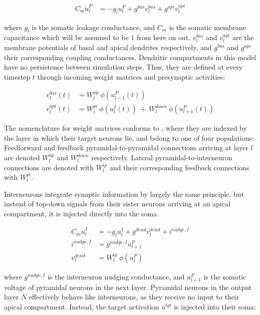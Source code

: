 \begin{align}
  C_m \dot{u}_l^P & = - g_l u_l^{P} + g^{bas} v_l^{bas} + g^{api} v_l^{api} \label{eq-pyr-dynamics-rate}
\end{align}

where $g_l$ is the somatic leakage conductance, and $C_m$ is the somatic membrane capacitance which will be assumed to
be $1$ from here on out. $v_l^{bas}$ and $v_l^{api}$ are the membrane potentials of basal and apical dendrites
respectively, and $g^{bas}$ and $g^{api}$ their corresponding coupling conductances.  Dendritic compartments in this
model have no persistence between simulation steps. Thus, they are defined at every timestep $t$ through incoming weight
matrices and presynaptic activities:

\begin{align}
  v_l^{bas}(t) & = W_l^{up} \ \phi(u_{l-1}^P(t)) \label{eq-v-bas-rate}                                     \\
  v_l^{api}(t) & =  W_l^{pi} \ \phi(u_l^I(t)) \ + \  W_l^{down} \ \phi(u_{l+1}^P(t)) \label{eq-v-api-rate}
\end{align}

The nomenclature for weight matrices conforms to \citep{Haider2021}, where they are indexed by the layer in which their
target neurons lie, and belong to one of four populations: Feedforward and feedback pyramidal-to-pyramidal connections
arriving at layer $l$ are denoted $W_l^{up}$ and $W_l^{down}$ respectively. Lateral pyramidal-to-interneuron connections
are denoted with $W_l^{ip}$ and their corresponding feedback connections with $W_l^{pi}$.

Interneurons integrate synaptic information by largely the same principle, but instead of top-down signals from their
sister neurons arriving at an apical compartment, it is injected directly into the soma.

\begin{align}
  C_m \dot{u}_l^I & = - g_l u_l^{I} + g^{dend} v_l^{dend} + i^{nudge, I}\label{eq-intn-dynamics} \\
  i^{nudge, I}    & = g^{nudge, I} u_{l+1}^P                                                     \\
  v_l^{dend}      & = W_l^{ip} \ \phi(u_{l}^P)
\end{align}

where $ g^{nudge, I}$ is the interneuron nudging conductance, and $u_{l+1}^P$ is the somatic voltage of pyramidal
neurons in the next layer.  Pyramidal neurons in the output layer $N$ effectively behave like interneurons, as they
receive no input to their apical compartment. Instead, the target  activation $u^{tgt}$ is injected into their soma:


